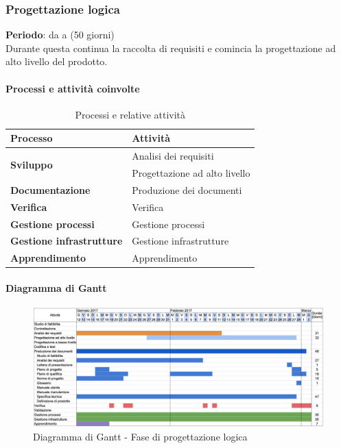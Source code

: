 	\subsubsection {Progettazione logica}
		\textbf{Periodo}: da  a  (50 giorni) \\
		Durante questa  continua la raccolta di requisiti e comincia la progettazione ad alto livello del prodotto.
		\paragraph{Processi e attività coinvolte}
			\begin{table}[H]
				\centering
				\begin{tabular}{ll}
					\toprule
					\textbf{Processo}                           & \textbf{Attività}              \\
					\midrule
					\multirow{2}{*}{\textbf{Sviluppo}}          & Analisi dei requisiti          \\
					& Progettazione ad alto livello  \\
					\midrule
					\textbf{Documentazione}            & Produzione dei documenti       \\
					\midrule
					\textbf{Verifica}                  & Verifica                       \\
					\midrule
					\textbf{Gestione processi} 					& Gestione processi              \\
					\midrule
					\textbf{Gestione infrastrutture}				& Gestione infrastrutture        \\
					\midrule
					\textbf{Apprendimento} 						& Apprendimento                 \\
					\bottomrule
				\end{tabular}
				\caption{Processi e relative attività}
				\label{Pl-ProcessiAttività}
			\end{table}
		\paragraph{Diagramma di Gantt}
		\begin{figure}[H]
			\centering
			\includegraphics[width=\textwidth]{img/Gantt/f2c.png}
			\caption{Diagramma di Gantt - Fase di progettazione logica}
		\end{figure}
